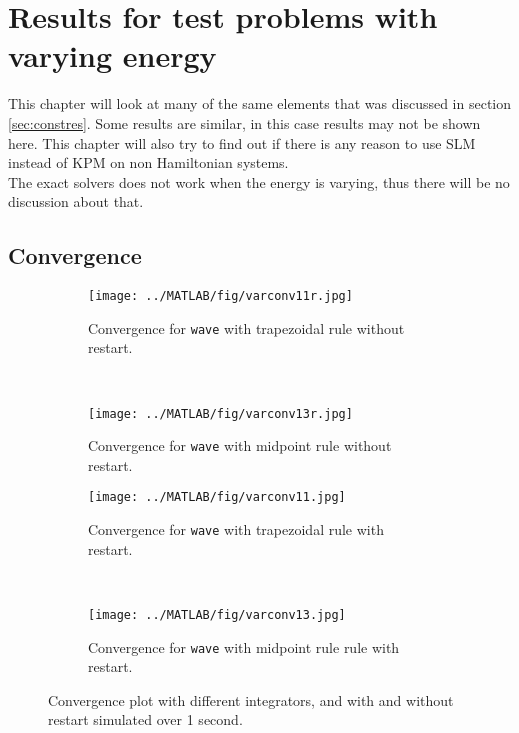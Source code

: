 \chapter{Results for test problems with varying energy}%
\label{sec:varyener} %
This chapter will look at many of the same elements that was discussed in section \ref{sec:constres}. Some results are similar, in this case results may not be shown here. This chapter will also try to find out if there is any reason to use SLM instead of KPM on non Hamiltonian systems. \\
The exact solvers does not work when the energy is varying, thus there will be no discussion about that.
\section{Convergence} %
\begin{figure}[H]
        \centering
        
		
		\begin{subfigure}[b]{0.45\textwidth}
                \texttt{[image: ../MATLAB/fig/varconv11r.jpg]}
                \caption{ Convergence for \texttt{wave} with trapezoidal rule without restart. }
                \label{fig:varconv11r}
        \end{subfigure}%
        ~
        \begin{subfigure}[b]{0.45\textwidth}
                \texttt{[image: ../MATLAB/fig/varconv13r.jpg]}
                \caption{ Convergence for \texttt{wave} with midpoint rule without restart. }
                \label{fig:varconv13r}
        \end{subfigure}
        \begin{subfigure}[b]{0.45\textwidth}
                \texttt{[image: ../MATLAB/fig/varconv11.jpg]}
                \caption{ Convergence for \texttt{wave} with trapezoidal rule with restart. }
                \label{fig:varconv11}
        \end{subfigure}%
        ~
        \begin{subfigure}[b]{0.45\textwidth}
                \texttt{[image: ../MATLAB/fig/varconv13.jpg]}
                \caption{ Convergence for \texttt{wave} with midpoint rule rule with restart. }
                \label{fig:varconv13}
        \end{subfigure}

        \caption{ Convergence plot with different integrators, and with and without restart simulated over 1 second. }
        \label{fig:varconv}
\end{figure}

